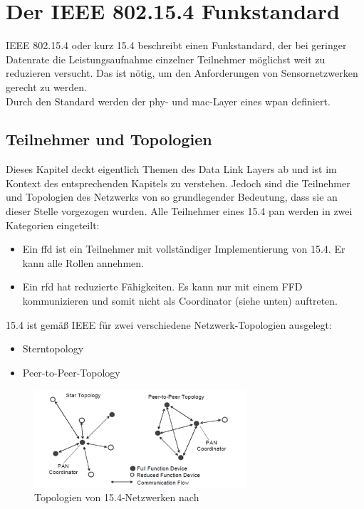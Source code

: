 \section{Der IEEE 802.15.4 Funkstandard}
IEEE 802.15.4 oder kurz 15.4 beschreibt einen Funkstandard, der bei geringer Datenrate die Leistungsaufnahme einzelner Teilnehmer möglichst weit zu reduzieren versucht. Das ist nötig, um den Anforderungen von Sensornetzwerken gerecht zu werden. \\
Durch den Standard werden der \ac{phy}- und \ac{mac}-Layer eines \ac{wpan} definiert. \\

\subsection{Teilnehmer und Topologien}
Dieses Kapitel deckt eigentlich Themen des Data Link Layers ab und ist im Kontext des entsprechenden Kapitels zu verstehen. Jedoch sind die Teilnehmer und Topologien des Netzwerks von so grundlegender Bedeutung, dass sie an dieser Stelle vorgezogen wurden. Alle Teilnehmer eines 15.4 \ac{pan} werden in zwei Kategorien eingeteilt:
\begin{itemize}
	\item Ein \ac{ffd} ist ein Teilnehmer mit vollständiger Implementierung von 15.4. Er kann alle Rollen annehmen.
	\item Ein \ac{rfd} hat reduzierte Fähigkeiten. Es kann nur mit einem FFD kommunizieren und somit nicht als Coordinator (siehe unten) auftreten.
\end{itemize}
15.4 ist gemäß IEEE für zwei verschiedene Netzwerk-Topologien ausgelegt:
\begin{itemize}
	\item Sterntopology
	\item Peer-to-Peer-Topology
\end{itemize}
\begin{figure}
	\centering
	\includegraphics[width=0.7\textwidth]{Grafiken-Alex/topology.jpg}
	\caption{Topologien von 15.4-Netzwerken nach \cite[S.46]{ieee154}}
	\label{topology}
\end{figure}
